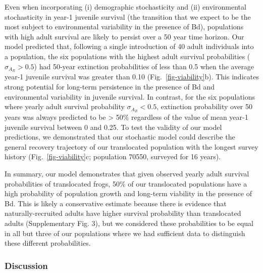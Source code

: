 \documentclass[
  letterpaper,
  DIV=11,
  numbers=noendperiod]{scrartcl}
\begin{document}
Even when incorporating (i) demographic stochasticity and (ii)
environmental stochasticity in year-1 juvenile survival (the transition
that we expect to be the most subject to environmental variability in
the presence of Bd), populations with high adult survival are likely to
persist over a 50 year time horizon. Our model predicted that, following
a single introduction of 40 adult individuals into a population, the six
populations with the highest adult survival probabilities
(\(\sigma_{A_R} > 0.5\)) had 50-year extinction probabilities of less
than 0.5 when the average year-1 juvenile survival was greater than 0.10
(Fig.~\ref{fig-viability}b). This indicates strong potential for
long-term persistence in the presence of Bd and environmental
variability in juvenile survival. In contrast, for the six populations
where yearly adult survival probability \(\sigma_{A_R} < 0.5\),
extinction probability over 50 years was always predicted to be
\textgreater{} 50\% regardless of the value of mean year-1 juvenile
survival between 0 and 0.25. To test the validity of our model
predictions, we demonstrated that our stochastic model could describe
the general recovery trajectory of our translocated population with the
longest survey history (Fig.~\ref{fig-viability}c; population 70550,
surveyed for 16 years).

In summary, our model demonstrates that given observed yearly adult
survival probabilities of translocated frogs, 50\% of our translocated
populations have a high probability of population growth and long-term
viability in the presence of Bd. This is likely a conservative estimate
because there is evidence that naturally-recruited adults have higher
survival probability than translocated adults (Supplementary Fig. 3),
but we considered these probabilities to be equal in all but three of
our populations where we had sufficient data to distinguish these
different probabilities.

\subsubsection{Discussion}\label{discussion}
\end{document}
